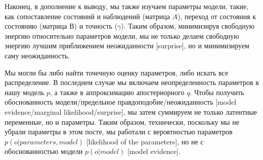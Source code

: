 \documentclass[twoside,leqno, 11pt]{article}
\begin{document}
	\begin{figure}[h]
	\end{figure}
	
	Наконец, в дополнение к выводу, мы также изучаем параметры модели, такие, как сопоставление состояний и наблюдений (матрица $A$), переход от состояния к состоянию (матрица $В$) и точность ($\gamma$). Таким образом, минимизируя свободную энергию относительно параметров модели, мы не только делаем свободную энергию лучшим приближением неожиданности [surprise], но и минимизируем саму неожиданность.
	
	\begin{figure}[h]
	\end{figure}
	
	
	Мы могли бы либо найти точечную оценку параметров, либо искать все распределение. В последнем случае мы включаем неопределенность параметров в нашу модель $p$, а также в аппроксимацию апостериорного $q$. Чтобы получить обоснованность модели/предельное правдоподобие/неожиданность [model evidence/marginal likelihood/surprise], мы затем суммируем не только латентные переменные, но и параметры. Таким образом, технически, поскольку мы не убрали параметры в этом посте, мы работали с вероятностью параметров $p(o|parameters, model)$ [likelihood of the parameters], но не с обоснованностью модели $p(o|model)$ [model evidence].
	
\end{document}
